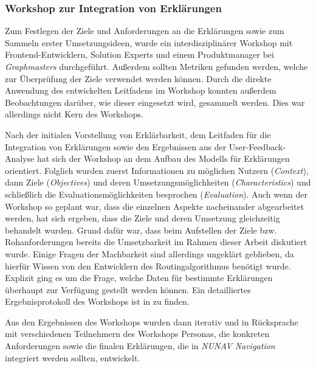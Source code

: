 \subsubsection{Workshop zur Integration von Erklärungen}

Zum Festlegen der Ziele und Anforderungen an die Erklärungen sowie zum Sammeln erster Umsetzungsideen, wurde ein interdisziplinärer Workshop mit Frontend-Entwicklern, \glqq Solution Experts\grqq{} und einem Produktmanager bei \textit{Graphmasters} durchgeführt. Außerdem sollten Metriken gefunden werden, welche zur Überprüfung der Ziele verwendet werden können. Durch die direkte Anwendung des entwickelten Leitfadens im Workshop konnten außerdem Beobachtungen darüber, wie dieser eingesetzt wird, gesammelt werden. Dies war allerdings nicht Kern des Workshops. 

Nach der initialen Vorstellung von Erklärbarkeit, dem Leitfaden für die Integration von Erklärungen sowie den Ergebnissen aus der User-Feedback-Analyse hat sich der Workshop an dem Aufbau des Modells für Erklärungen orientiert. Folglich wurden zuerst Informationen zu möglichen Nutzern (\textit{Context}), dann Ziele (\textit{Objectives}) und deren Umsetzungsmöglichkeiten (\textit{Characteristics}) und schließlich die Evaluationsmöglichkeiten besprochen (\textit{Evaluation}). Auch wenn der Workshop so geplant war, dass die einzelnen Aspekte nacheinander abgearbeitet werden, hat sich ergeben, dass die Ziele und deren Umsetzung gleichzeitig behandelt wurden. Grund dafür war, dass beim Aufstellen der Ziele bzw. Rohanforderungen bereits die Umsetzbarkeit im Rahmen dieser Arbeit diskutiert wurde. Einige Fragen der Machbarkeit sind allerdings ungeklärt geblieben, da hierfür Wissen von den Entwicklern des Routingalgorithmus benötigt wurde. Explizit ging es um die Frage, welche Daten für bestimmte Erklärungen überhaupt zur Verfügung gestellt werden können. Ein detailliertes Ergebnisprotokoll des Workshops ist in  zu finden.

Aus den Ergebnissen des Workshops wurden dann iterativ und in Rücksprache mit verschiedenen Teilnehmern des Workshops Personas, die konkreten Anforderungen sowie die finalen Erklärungen, die in \textit{NUNAV Navigation} integriert werden sollten, entwickelt.